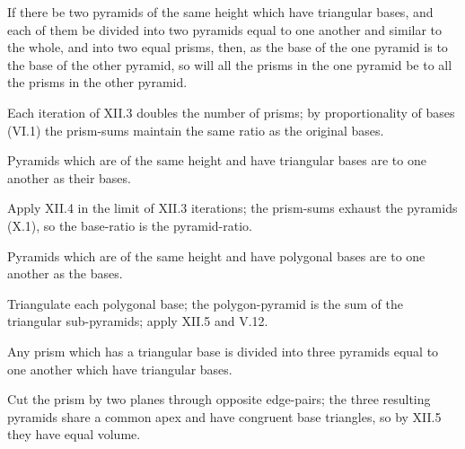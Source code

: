 \begin{claim}
\label{prop:XII.4}
If there be two pyramids of the same height which have triangular
bases, and each of them be divided into two pyramids equal to one
another and similar to the whole, and into two equal prisms, then,
as the base of the one pyramid is to the base of the other pyramid,
so will all the prisms in the one pyramid be to all the prisms in
the other pyramid.
\end{claim}
\begin{evidence}
\label{ev:XII.4}
Each iteration of XII.3 doubles the number of prisms; by
proportionality of bases (VI.1) the prism-sums maintain the same
ratio as the original bases.
\end{evidence}

\begin{claim}
\label{prop:XII.5}
Pyramids which are of the same height and have triangular bases are
to one another as their bases.
\end{claim}
\begin{evidence}
\label{ev:XII.5}
Apply XII.4 in the limit of XII.3 iterations; the prism-sums
exhaust the pyramids (X.1), so the base-ratio is the pyramid-ratio.
\end{evidence}

\begin{claim}
\label{prop:XII.6}
Pyramids which are of the same height and have polygonal bases are
to one another as the bases.
\end{claim}
\begin{evidence}
\label{ev:XII.6}
Triangulate each polygonal base; the polygon-pyramid is the sum of
the triangular sub-pyramids; apply XII.5 and V.12.
\end{evidence}

\begin{claim}
\label{prop:XII.7}
Any prism which has a triangular base is divided into three pyramids
equal to one another which have triangular bases.
\end{claim}
\begin{evidence}
\label{ev:XII.7}
Cut the prism by two planes through opposite edge-pairs; the three
resulting pyramids share a common apex and have congruent base
triangles, so by XII.5 they have equal volume.
\end{evidence}


